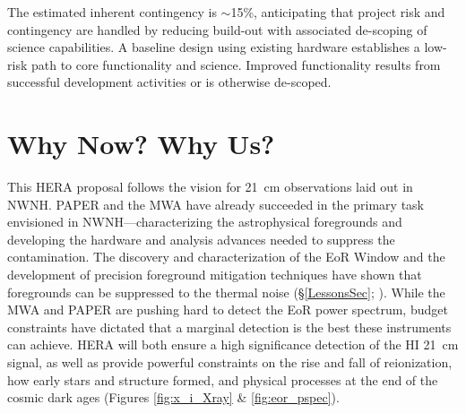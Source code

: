 \documentclass[preprint]{aastex}
\def\HI{{H{\small I }}}
\begin{document}
%

The estimated inherent contingency is $\sim$15\%, anticipating that project 
risk and contingency are handled by reducing
build-out with associated de-scoping of science capabilities.
A baseline design using
existing hardware establishes a low-risk path to core functionality and science.  Improved functionality
results from successful development activities or is otherwise de-scoped.


\section{Why Now? Why Us?} %

This HERA proposal follows the vision for 21~cm observations laid out in NWNH.
PAPER and the MWA have already succeeded in the primary task envisioned in
NWNH---characterizing the astrophysical foregrounds and developing the hardware
and analysis advances needed to suppress the contamination. The discovery and
characterization of the EoR Window and the development of precision foreground
mitigation techniques have shown that foregrounds can be suppressed to the
thermal noise (\S \ref{LessonsSec}; \citealt{parsons_et_al2013}). While the MWA
and PAPER are pushing hard to detect the EoR power spectrum, budget constraints have
dictated that a marginal detection is the best these instruments can achieve.
HERA will both ensure a high significance detection of the \HI 21~cm signal, as
well as provide powerful constraints on the rise and fall of reionization, how
early stars and structure formed, and physical processes at the end of the
cosmic dark ages (Figures \ref{fig:x_i_Xray} \& \ref{fig:eor_pspec}).
\end{document}

